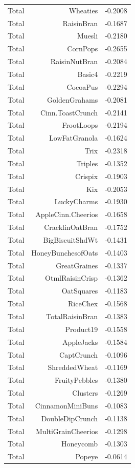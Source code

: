 \begin{longtable}{@{}lrr@{}}
Total & Wheaties & -0.2008 \\
Total & RaisinBran & -0.1687 \\
Total & Muesli & -0.2180 \\
Total & CornPops & -0.2655 \\
Total & RaisinNutBran & -0.2084 \\
Total & Basic4 & -0.2219 \\
Total & CocoaPus & -0.2294 \\
Total & GoldenGrahams & -0.2081 \\
Total & Cinn.ToastCrunch & -0.2141 \\
Total & FrootLoops & -0.2194 \\
Total & LowFatGranola & -0.1624 \\
Total & Trix & -0.2318 \\
Total & Triples & -0.1352 \\
Total & Crispix & -0.1903 \\
Total & Kix & -0.2053 \\
Total & LuckyCharms & -0.1930 \\
Total & AppleCinn.Cheerios & -0.1658 \\
Total & CracklinOatBran & -0.1752 \\
Total & BigBiscuitShdWt & -0.1431 \\
Total & HoneyBunchesofOats & -0.1403 \\
Total & GreatGraines & -0.1337 \\
Total & OtmlRaisinCrisp & -0.1362 \\
Total & OatSquares & -0.1183 \\
Total & RiceChex & -0.1568 \\
Total & TotalRaisinBran & -0.1383 \\
Total & Product19 & -0.1558 \\
Total & AppleJacks & -0.1584 \\
Total & CaptCrunch & -0.1096 \\
Total & ShreddedWheat & -0.1169 \\
Total & FruityPebbles & -0.1380 \\
Total & Clusters & -0.1269 \\
Total & CinnamonMiniBuns & -0.1083 \\
Total & DoubleDipCrunch & -0.1138 \\
Total & MultiGrainCheerios & -0.1298 \\
Total & Honeycomb & -0.1303 \\
Total & Popeye & -0.0614 \\

\end{longtable}
